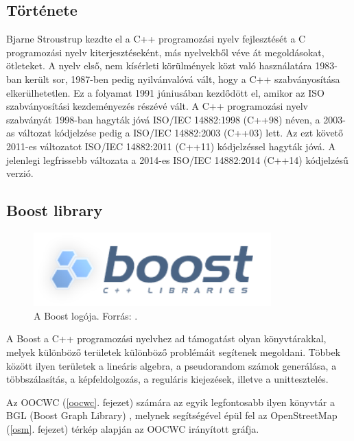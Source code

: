 \documentclass[a4paper,12pt]{report}
\begin{document}


\subsection{Története}
\label{cpphistory}

Bjarne Stroustrup kezdte el a C++ programozási nyelv fejlesztését a C programozási nyelv kiterjesztéseként, más nyelvekből véve át megoldásokat, ötleteket. A nyelv első, nem kísérleti körülmények közt való használatára 1983-ban került sor, 1987-ben pedig nyilvánvalóvá vált, hogy a C++ szabványosítása elkerülhetetlen. Ez a folyamat 1991 júniusában kezdődött el, amikor az ISO szabványosítási kezdeményezés részévé vált. A C++ programozási nyelv szabványát 1998-ban hagyták jóvá ISO/IEC 14882:1998 \cite{c++98} (C++98) néven, a 2003-as változat kódjelzése pedig a ISO/IEC 14882:2003 \cite{c++03} (C++03) lett. Az ezt követő 2011-es változatot ISO/IEC 14882:2011 \cite{c++11} (C++11) kódjelzéssel hagyták jóvá. A jelenlegi legfrissebb változata a 2014-es ISO/IEC 14882:2014 \cite{c++14} (C++14) kódjelzésű verzió. 

\subsection{Boost library}
\label{boost}

\begin{figure}[h]
\centerline{
\includegraphics[width=3.6in]{img/boost}}
\caption{A Boost logója. Forrás: \cite{boostlogo}.}
\label{basedesign}
\end{figure}

\vspace{2mm}
A Boost a C++ programozási nyelvhez ad támogatást olyan könyvtárakkal, melyek különböző területek különböző problémáit segítenek megoldani. Többek között ilyen területek a lineáris algebra, a pseudorandom számok generálása, a többszálasítás, a képfeldolgozás, a reguláris kiejezések, illetve a unittesztelés. 

\vspace{2mm}
Az OOCWC (\ref{oocwc}. fejezet) számára az egyik legfontosabb ilyen könyvtár a BGL (Boost Graph Library) \cite{bgl}, melynek segítségével épül fel az OpenStreetMap \cite{osm} (\ref{osm}. fejezet) térkép alapján az OOCWC irányított gráfja.
\end{document}

